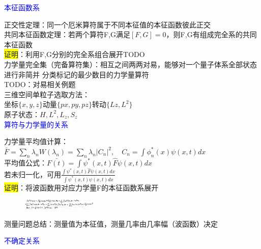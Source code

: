 \documentclass[a4paper,8pt]{extarticle} %
\newcommand{\bluetext}[1]{\textcolor{blue}{#1}}
\newcommand{\yellowback}[1]{\colorbox{yellow}{#1}}
\begin{document}
\begin{multicols}{3}
\bluetext{本征函数系}

正交性定理：同一个厄米算符属于不同本征值的本征函数彼此正交\\
共同本征函数定理：若两个算符F,G满足$[F,G]=0$，则F,G有组成完全系的共同本征函数\\
\yellowback{证明}：利用F,G分别的完全系组合展开TODO\\
力学量完全集（完备算符集）：相互之间两两对易，能够对一个量子体系全部状态进行非简并
分类标记的最少数目的力学量算符\\
TODO：对易相关例题\\
三维空间单粒子选取方法：\\
坐标$\{x,y,z\}$动量$\{px,py,pz\}$转动$\{Lz,L^2\}$\\
原子状态：$H,L^2,L_z,S_z$\\
\bluetext{算符与力学量的关系}

力学量平均值计算：\\$\bar{F} = \sum_n \lambda_n W(\lambda_n) = \sum_n \lambda_n |C_n|^2, \quad C_n = \int \phi_n^*(x) \psi(x,t) dx$\\
平均值公式：$\bar{F(t)} = \int \psi^*(x,t) \hat{F} \psi(x,t) dx$\\
若未归一化，可用$\frac{\int \psi^*(x,t) \hat{F} \psi(x,t) dx}{\int \psi^*(x,t) \psi(x,t) dx}$\\
\yellowback{证明}：将波函数用对应力学量F的本征函数系展开\\
\begin{figure}[H]
    \vspace{-0.5cm}
    \centering
    \includegraphics[width=0.32\textwidth]{images/9.png}
    \vspace{-0.6cm}
\end{figure}
测量问题总结：测量值为本征值，测量几率由几率幅（波函数）决定

\bluetext{不确定关系}


\end{multicols}
\end{document}
